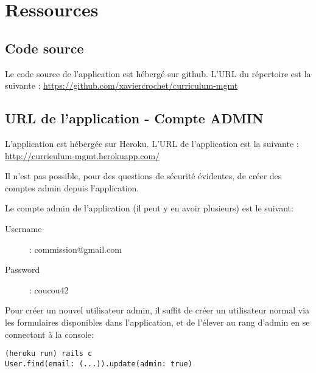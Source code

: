 \chapter{Ressources}
\section{Code source}
Le code source de l'application est hébergé sur github. L'URL du répertoire est la suivante : \url{https://github.com/xaviercrochet/curriculum-mgmt}
\section{URL de l'application - Compte ADMIN}
L'application est hébergée sur Heroku. L'URL de l'application est la suivante : \url{http://curriculum-mgmt.herokuapp.com/}

Il n'est pas possible, pour des questions de sécurité évidentes, de créer des comptes admin depuis l'application. 

Le compte admin de l'application (il peut y en avoir plusieurs) est le suivant:

\begin{description}
\item[Username] : commission@gmail.com
\item[Password] : coucou42
\end{description}

Pour créer un nouvel utilisateur admin, il suffit de créer un utilisateur normal via les formulaires disponibles dans l'application, et de l'élever au rang d'admin en se connectant à la console:

\begin{lstlisting}
(heroku run) rails c
User.find(email: (...)).update(admin: true)
\end{lstlisting} 